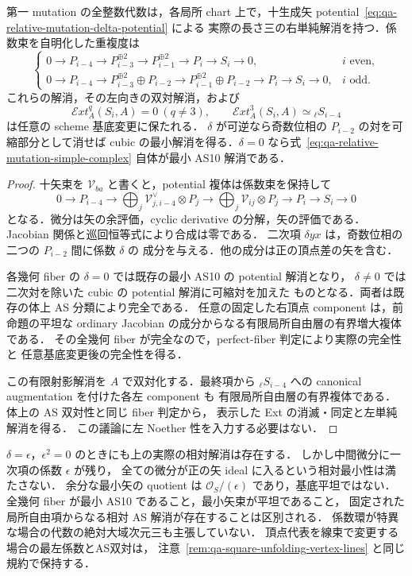 \begin{theorem}[壁を横断する実際の相対AS解消]
\label{thm:qa-relative-mutation-nonminimal-as-resolutions}
第一 mutation の全整数代数は，各局所 chart 上で，十生成矢
potential~\eqref{eq:qa-relative-mutation-delta-potential} による
実際の長さ三の右単純解消を持つ．係数束を自明化した重複度は
\[
 \begin{cases}
 0\to P_{i-4}\to P_{i-3}^{\oplus2}\to P_{i-1}^{\oplus2}
                  \to P_i\to S_i\to0,&i\text{ even},\\
 0\to P_{i-4}\to P_{i-3}^{\oplus2}\oplus P_{i-2}
       \to P_{i-1}^{\oplus2}\oplus P_{i-2}
                  \to P_i\to S_i\to0,&i\text{ odd}.
 \end{cases}
 \tag{MS}\label{eq:qa-relative-mutation-simple-complex}
\]
これらの解消，その左向きの双対解消，および
\[
 \mathcal E xt_A^q(S_i,A)=0\ (q\ne3),\qquad
 \mathcal E xt_A^3(S_i,A)\simeq {}_\ell S_{i-4}
\]
は任意の scheme 基底変更に保たれる．
$\delta$ が可逆なら奇数位相の $P_{i-2}$ の対を可縮部分として消せば
cubic の最小解消を得る．$\delta=0$ なら式~\eqref{eq:qa-relative-mutation-simple-complex}
自体が最小 AS10 解消である．
\end{theorem}
\begin{proof}
十矢束を $\mathcal V_{ba}$ と書くと，potential 複体は係数束を保持して
\[
 0\to P_{i-4}\to
 \bigoplus_j\mathcal V_{j,i-4}^\vee\otimes P_j\to
 \bigoplus_j\mathcal V_{ij}\otimes P_j\to P_i\to S_i\to0
\]
となる．微分は矢の余評価，cyclic derivative の分解，矢の評価である．
Jacobian 関係と巡回恒等式により合成は零である．
二次項 $\delta yx$ は，奇数位相の二つの $P_{i-2}$ 間に係数 $\delta$ の
成分を与える．他の成分は正の頂点差の矢を含む．

各幾何 fiber の $\delta=0$ では既存の最小 AS10 の potential 解消となり，
$\delta\ne0$ では二次対を除いた cubic の potential 解消に可縮対を加えた
ものとなる．両者は既存の体上 AS 分類により完全である．
任意の固定した右頂点 component は，前命題の平坦な ordinary Jacobian
の成分からなる有限局所自由層の有界増大複体である．
その全幾何 fiber が完全なので，perfect-fiber 判定により実際の完全性と
任意基底変更後の完全性を得る．

この有限射影解消を $A$ で双対化する．最終項から
${}_\ell S_{i-4}$ への canonical augmentation を付けた各左 component も
有限局所自由層の有界複体である．体上の AS 双対性と同じ fiber 判定から，
表示した Ext の消滅・同定と左単純解消を得る．
この議論に左 Noether 性を入力する必要はない．
\end{proof}

\begin{remark}[最小性と非被約横断方向]
$\delta=\epsilon$，$\epsilon^2=0$ のときにも上の実際の相対解消は存在する．
しかし中間微分に一次項の係数 $\epsilon$ が残り，
全ての微分が正の矢 ideal に入るという相対最小性は満たさない．
余分な最小矢の quotient は $\mathcal O_S/(\epsilon)$ であり，基底平坦ではない．
全幾何 fiber が最小 AS10 であること，最小矢束が平坦であること，
固定された局所自由項からなる相対 AS 解消が存在することは区別される．
係数環が特異な場合の代数の絶対大域次元三も主張していない．
頂点代表を線束で変更する場合の最左係数とAS双対は，
注意~\ref{rem:qa-square-unfolding-vertex-lines} と同じ規約で保持する．
\end{remark}
